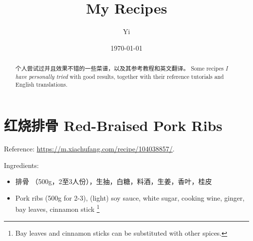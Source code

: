 \documentclass{article}
\newcommand{\chn}[1]{\foreignlanguage{chinese-simplified}{#1}}
\begin{document}
\title{My Recipes}
\author{Yi}
\date{\today}
\maketitle
\begin{abstract}
    \chn{\textsf{个人尝试过}并且效果不错的一些菜谱，以及其参考教程和英文翻译。}
    Some recipes \emph{I have personally tried} with good results, together with their reference tutorials and English translations.
\end{abstract}
\tableofcontents
\section{\foreignlanguage{chinese-simplified}{红烧排骨} Red-Braised Pork Ribs}
Reference: \url{https://m.xiachufang.com/recipe/104038857/}.

Ingredients: 
\begin{itemize}
    \item \chn{排骨 （500g，2至3人份），生抽，白糖，料酒，生姜，香叶，桂皮}
    \item Pork ribs (500g for 2-3), (light) soy sauce, white sugar, cooking wine, ginger, bay leaves, cinnamon stick \footnote{Bay leaves and cinnamon sticks can be substituted with other spices.}
\end{itemize}
\end{document}
